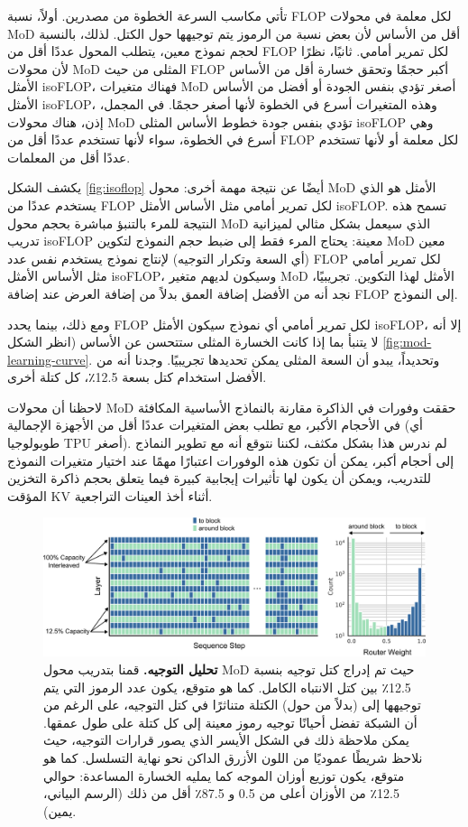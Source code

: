 \documentclass[11pt, a4paper, onecolumn, logo, copyright]{googledeepmind}
\begin{document}
تأتي مكاسب السرعة الخطوة من مصدرين. أولاً، نسبة FLOP لكل معلمة في محولات MoD أقل من الأساس لأن بعض نسبة من الرموز يتم توجيهها حول الكتل. لذلك، بالنسبة لحجم نموذج معين، يتطلب المحول عددًا أقل من FLOP لكل تمرير أمامي. ثانيًا، نظرًا لأن محولات MoD المثلى من حيث FLOP أكبر حجمًا وتحقق خسارة أقل من الأساس الأمثل isoFLOP، فهناك متغيرات MoD أصغر تؤدي بنفس الجودة أو أفضل من الأساس الأمثل isoFLOP، وهذه المتغيرات أسرع في الخطوة لأنها أصغر حجمًا. في المجمل، إذن، هناك محولات MoD تؤدي بنفس جودة خطوط الأساس المثلى isoFLOP وهي أسرع في الخطوة، سواء لأنها تستخدم عددًا أقل من FLOP لكل معلمة أو لأنها تستخدم عددًا أقل من المعلمات.

يكشف الشكل \ref{fig:isoflop} أيضًا عن نتيجة مهمة أخرى: محول MoD الأمثل هو الذي يستخدم عددًا من FLOP لكل تمرير أمامي مثل الأساس الأمثل isoFLOP. تسمح هذه النتيجة للمرء بالتنبؤ مباشرة بحجم محول MoD الذي سيعمل بشكل مثالي لميزانية تدريب isoFLOP معينة: يحتاج المرء فقط إلى ضبط حجم النموذج لتكوين MoD معين (أي السعة وتكرار التوجيه) لإنتاج نموذج يستخدم نفس عدد FLOP لكل تمرير أمامي مثل الأساس الأمثل isoFLOP، وسيكون لديهم متغير MoD الأمثل لهذا التكوين. تجريبيًا، نجد أنه من الأفضل إضافة العمق بدلاً من إضافة العرض عند إضافة FLOP إلى النموذج.

ومع ذلك، بينما يحدد FLOP لكل تمرير أمامي أي نموذج سيكون الأمثل isoFLOP، إلا أنه لا يتنبأ بما إذا كانت الخسارة المثلى ستتحسن عن الأساس (انظر الشكل \ref{fig:mod-learning-curve}. وتحديداً، يبدو أن السعة المثلى يمكن تحديدها تجريبيًا. وجدنا أنه من الأفضل استخدام كتل بسعة 12.5٪، كل كتلة أخرى.

لاحظنا أن محولات MoD حققت وفورات في الذاكرة مقارنة بالنماذج الأساسية المكافئة في الأحجام الأكبر، مع تطلب بعض المتغيرات عددًا أقل من الأجهزة الإجمالية (أي طوبولوجيا TPU أصغر). لم ندرس هذا بشكل مكثف، لكننا نتوقع أنه مع تطوير النماذج إلى أحجام أكبر، يمكن أن تكون هذه الوفورات اعتبارًا مهمًا عند اختيار متغيرات النموذج للتدريب، ويمكن أن يكون لها تأثيرات إيجابية كبيرة فيما يتعلق بحجم ذاكرة التخزين المؤقت KV أثناء أخذ العينات التراجعية.

\begin{figure}[h]
\centering
\includegraphics[width=\textwidth]{weight_analysis.png}
\caption{\textbf{تحليل التوجيه.} قمنا بتدريب محول MoD حيث تم إدراج كتل توجيه بنسبة 12.5٪ بين كتل الانتباه الكامل. كما هو متوقع، يكون عدد الرموز التي يتم توجيهها إلى (بدلاً من حول) الكتلة متناثرًا في كتل التوجيه، على الرغم من أن الشبكة تفضل أحيانًا توجيه رموز معينة إلى كل كتلة على طول عمقها. يمكن ملاحظة ذلك في الشكل الأيسر الذي يصور قرارات التوجيه، حيث نلاحظ شريطًا عموديًا من اللون الأزرق الداكن نحو نهاية التسلسل. كما هو متوقع، يكون توزيع أوزان الموجه كما يمليه الخسارة المساعدة: حوالي 12.5٪ من الأوزان أعلى من 0.5 و 87.5٪ أقل من ذلك (الرسم البياني، يمين).}
\label{fig:routing-analysis}
\end{figure}
\end{document}
